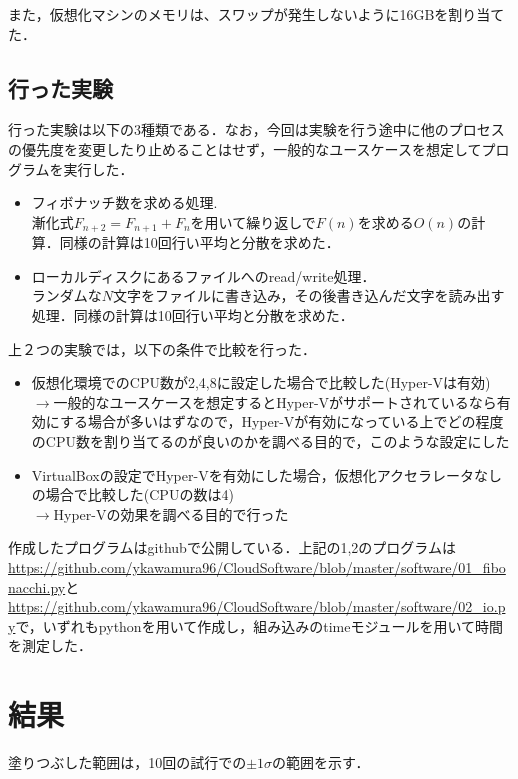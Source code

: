 \documentclass[onecolumn]{preport}
\begin{document}
また，仮想化マシンのメモリは、スワップが発生しないように16GBを割り当てた．

\subsection{行った実験}
行った実験は以下の3種類である．なお，今回は実験を行う途中に他のプロセスの優先度を変更したり止めることはせず，一般的なユースケースを想定してプログラムを実行した．

\begin {itemize}
\item フィボナッチ数を求める処理.\\ 漸化式$F_{n+2} = F_{n+1} + F_{n}$を用いて繰り返しで$F(n)$を求める$O(n)$の計算．同様の計算は10回行い平均と分散を求めた．
\item ローカルディスクにあるファイルへのread/write処理．\\ランダムな$N$文字をファイルに書き込み，その後書き込んだ文字を読み出す処理．同様の計算は10回行い平均と分散を求めた．
\end {itemize}

上２つの実験では，以下の条件で比較を行った．
\begin {itemize}
\item 仮想化環境でのCPU数が2,4,8に設定した場合で比較した(Hyper-Vは有効)\\ $\rightarrow$一般的なユースケースを想定するとHyper-Vがサポートされているなら有効にする場合が多いはずなので，Hyper-Vが有効になっている上でどの程度のCPU数を割り当てるのが良いのかを調べる目的で，このような設定にした
\item VirtualBoxの設定でHyper-Vを有効にした場合，仮想化アクセラレータなしの場合で比較した(CPUの数は4)\\ $\rightarrow$Hyper-Vの効果を調べる目的で行った
  
\end {itemize}

作成したプログラムはgithubで公開している\cite{myrepo}．上記の1,2のプログラムは\url{https://github.com/ykawamura96/CloudSoftware/blob/master/software/01_fibonacchi.py}と\url{https://github.com/ykawamura96/CloudSoftware/blob/master/software/02_io.py}で，いずれもpythonを用いて作成し，組み込みのtimeモジュールを用いて時間を測定した．

\section{結果}
塗りつぶした範囲は，10回の試行での$\pm 1 \sigma$の範囲を示す．
\end{document}
